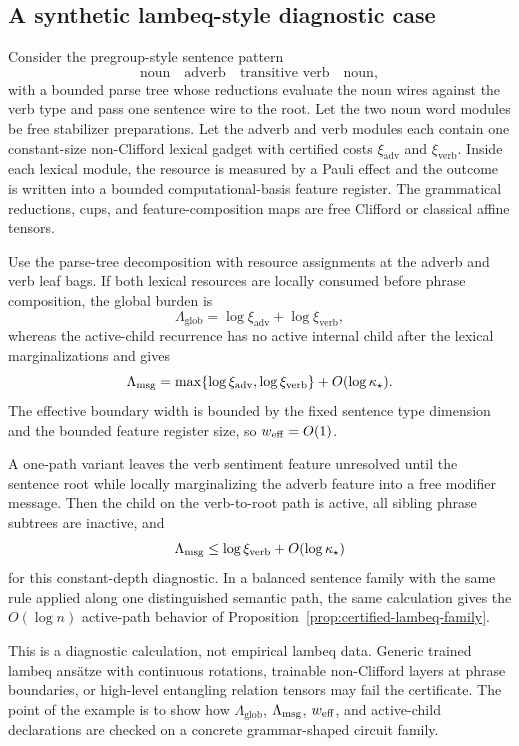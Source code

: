 \subsection{A synthetic lambeq-style diagnostic case}

Consider the pregroup-style sentence pattern
\[
\text{noun}\quad \text{adverb}\quad \text{transitive verb}\quad \text{noun},
\]
with a bounded parse tree whose reductions evaluate the noun wires against the verb type and pass one sentence wire to the root. Let the two noun word modules be free stabilizer preparations. Let the adverb and verb modules each contain one constant-size non-Clifford lexical gadget with certified costs \(\xi_{\mathrm{adv}}\) and \(\xi_{\mathrm{verb}}\). Inside each lexical module, the resource is measured by a Pauli effect and the outcome is written into a bounded computational-basis feature register. The grammatical reductions, cups, and feature-composition maps are free Clifford or classical affine tensors.

Use the parse-tree decomposition with resource assignments at the adverb and verb leaf bags. If both lexical resources are locally consumed before phrase composition, the global burden is
\[
\Lambda_{\mathrm{glob}}
=\log\xi_{\mathrm{adv}}+\log\xi_{\mathrm{verb}},
\]
whereas the active-child recurrence has no active internal child after the lexical marginalizations and gives
\[
\Lambda_{\mathrm{msg}}
=\max\{\log\xi_{\mathrm{adv}},\log\xi_{\mathrm{verb}}\}+O(\log\kappa_\star).
\]
The effective boundary width is bounded by the fixed sentence type dimension and the bounded feature register size, so \(w_{\mathrm{eff}}=O(1)\).

A one-path variant leaves the verb sentiment feature unresolved until the sentence root while locally marginalizing the adverb feature into a free modifier message. Then the child on the verb-to-root path is active, all sibling phrase subtrees are inactive, and
\[
\Lambda_{\mathrm{msg}}
\le \log\xi_{\mathrm{verb}}+O(\log\kappa_\star)
\]
for this constant-depth diagnostic. In a balanced sentence family with the same rule applied along one distinguished semantic path, the same calculation gives the \(O(\log n)\) active-path behavior of Proposition~\ref{prop:certified-lambeq-family}.

This is a diagnostic calculation, not empirical lambeq data. Generic trained lambeq ans\"atze with continuous rotations, trainable non-Clifford layers at phrase boundaries, or high-level entangling relation tensors may fail the certificate. The point of the example is to show how \(\Lambda_{\mathrm{glob}}\), \(\Lambda_{\mathrm{msg}}\), \(w_{\mathrm{eff}}\), and active-child declarations are checked on a concrete grammar-shaped circuit family.

